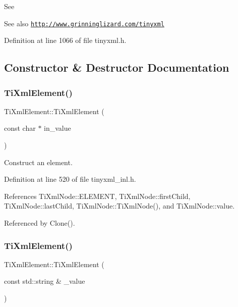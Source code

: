 See \begin{DoxySeeAlso}{See also}
\href{http://www.grinninglizard.com/tinyxml}{\tt http\+://www.\+grinninglizard.\+com/tinyxml} 
\end{DoxySeeAlso}


Definition at line 1066 of file tinyxml.\+h.



\subsection{Constructor \& Destructor Documentation}
\hypertarget{class_ti_xml_element_a01bc3ab372d35da08efcbbe65ad90c60}{}\label{class_ti_xml_element_a01bc3ab372d35da08efcbbe65ad90c60} 
\subsubsection{\texorpdfstring{Ti\+Xml\+Element()}{TiXmlElement()}\hspace{0.1cm}{\footnotesize\ttfamily [1/3]}}
{\footnotesize\ttfamily Ti\+Xml\+Element\+::\+Ti\+Xml\+Element (\begin{DoxyParamCaption}\item[{const char $\ast$}]{in\+\_\+value }\end{DoxyParamCaption})}



Construct an element. 



Definition at line 520 of file tinyxml\+\_\+inl.\+h.



References Ti\+Xml\+Node\+::\+E\+L\+E\+M\+E\+NT, Ti\+Xml\+Node\+::first\+Child, Ti\+Xml\+Node\+::last\+Child, Ti\+Xml\+Node\+::\+Ti\+Xml\+Node(), and Ti\+Xml\+Node\+::value.



Referenced by Clone().

\hypertarget{class_ti_xml_element_a40fc2e3c1a955e2f78e1a32350d180e7}{}\label{class_ti_xml_element_a40fc2e3c1a955e2f78e1a32350d180e7} 
\subsubsection{\texorpdfstring{Ti\+Xml\+Element()}{TiXmlElement()}\hspace{0.1cm}{\footnotesize\ttfamily [2/3]}}
{\footnotesize\ttfamily Ti\+Xml\+Element\+::\+Ti\+Xml\+Element (\begin{DoxyParamCaption}\item[{const std\+::string \&}]{\+\_\+value }\end{DoxyParamCaption})}



